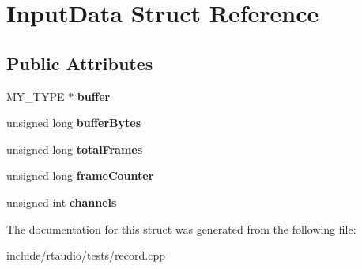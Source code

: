 \hypertarget{struct_input_data}{}\section{Input\+Data Struct Reference}
\label{struct_input_data}
\subsection*{Public Attributes}
\begin{DoxyCompactItemize}
\item 
M\+Y\+\_\+\+T\+Y\+PE $\ast$ {\bfseries buffer}\hypertarget{struct_input_data_a4fb117ef68bb963c51e69d5e56908a01}{}\label{struct_input_data_a4fb117ef68bb963c51e69d5e56908a01}

\item 
unsigned long {\bfseries buffer\+Bytes}\hypertarget{struct_input_data_afa801f65e86d9d0c6c975f888c66c222}{}\label{struct_input_data_afa801f65e86d9d0c6c975f888c66c222}

\item 
unsigned long {\bfseries total\+Frames}\hypertarget{struct_input_data_a1f51c82d3e4d41269cbd4b322af00dab}{}\label{struct_input_data_a1f51c82d3e4d41269cbd4b322af00dab}

\item 
unsigned long {\bfseries frame\+Counter}\hypertarget{struct_input_data_ae372534ce5f8d5706395f317f47f795a}{}\label{struct_input_data_ae372534ce5f8d5706395f317f47f795a}

\item 
unsigned int {\bfseries channels}\hypertarget{struct_input_data_ae0bd31c1292604100ea62e88fda4006b}{}\label{struct_input_data_ae0bd31c1292604100ea62e88fda4006b}

\end{DoxyCompactItemize}


The documentation for this struct was generated from the following file\+:\begin{DoxyCompactItemize}
\item 
include/rtaudio/tests/record.\+cpp\end{DoxyCompactItemize}
